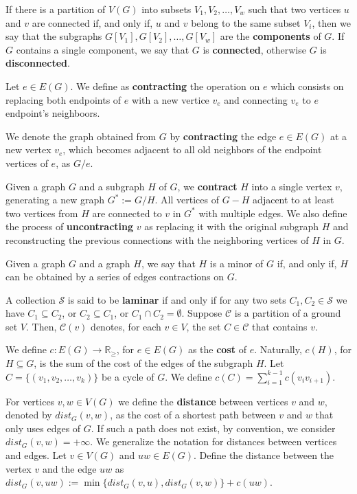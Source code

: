 If there is a partition of \(V(G)\) into subsets \(V_1 , V_2 , \dots, V_w\) such that two vertices \(u\) and \(v\) are connected if, and only if, \(u\) and \(v\) belong to the same subset \(V_i\), then we say that the subgraphs \(G[V_1], G[V_2], \dots, G[V_w]\) are the \textbf{components} of \(G\). If \(G\) contains a single component, we say that \(G\) is \textbf{connected}, otherwise \(G\) is \textbf{disconnected}.

Let \(e \in E(G)\). We define as \textbf{contracting} the operation on \(e\) which consists on replacing both endpoints of \(e\) with a new vertice \(v_e\) and connecting \(v_e\) to \(e\) endpoint's neighboors.

We denote the graph obtained from \(G\) by \textbf{contracting} the edge \(e \in E(G)\) at a new vertex \(v_e\), which becomes adjacent to all old neighbors of the endpoint vertices of \(e\), as \(G / e\).

Given a graph \(G\) and a subgraph \(H\) of \(G\), we \textbf{contract} \(H\) into a single vertex \(v\), generating a new graph \(G^\ast := G / H\). All vertices of \(G - H\) adjacent to at least two vertices from \(H\) are connected to \(v\) in \(G^\ast\) with multiple edges. We also define the process of \textbf{uncontracting} \(v\) as replacing it with the original subgraph \(H\) and reconstructing the previous connections with the neighboring vertices of \(H\) in \(G\).

Given a graph \(G\) and a graph \(H\), we say that \(H\) is a minor of \(G\) if, and only if, \(H\) can be obtained by a series of edges contractions on \(G\).

A collection \(\mathcal{S}\) is said to be \textbf{laminar} if and only if for any two sets \(C_1, C_2 \in \mathcal{S}\) we have \(C_1 \subseteq C_2\), or \(C_2 \subseteq C_1\), or \(C_1 \cap C_2 = \emptyset\). Suppose \(\mathcal{C}\) is a partition of a ground set \(V\). Then, \(\mathcal{C}(v)\) denotes, for each \(v \in V\), the set \(C \in \mathcal{C}\) that contains \(v\).

We define \(c \colon E(G) \to \mathbb{R}_\ge\), for \(e \in E(G)\) as the \textbf{cost} of \(e\). Naturally, \(c(H)\), for \(H \subseteq G\), is the sum of the cost of the edges of the subgraph \(H\). Let \(C = \{(v_1, v_2, \dots, v_k)\}\) be a cycle of \(G\). We define \(c(C) = \sum_{i=1}^{k-1} c(v_i v_{i+1})\).

For vertices \(v, w \in V(G)\) we define the \textbf{distance} between vertices $v$ and $w$, denoted by \(dist_G(v, w)\), as the cost of a shortest path between \(v\) and \(w\) that only uses edges of \(G\). If such a path does not exist, by convention, we consider \(dist_G(v, w) = +\infty\). We generalize the notation for distances between vertices and edges. Let \(v \in V(G)\) and \(uw \in E(G)\). Define the distance between the vertex \(v\) and the edge \(uw\) as \(dist_G(v, uw) := \min\{dist_G(v, u), dist_G(v, w)\} + c(uw)\).

